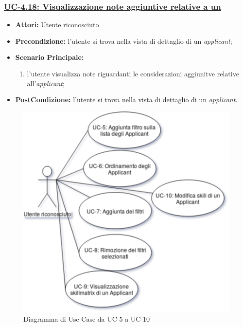 \subsubsection{\underline{UC-4.18: Visualizzazione note aggiuntive relative a un \applicant}}
\begin{itemize}
	\item \textbf{Attori:} Utente riconosciuto
	\item \textbf{Precondizione:} l'utente si trova nella vista di dettaglio di un \textit{applicant};
	\item \textbf{Scenario Principale:}
	\begin{enumerate} 
		\item l'utente visualizza note riguardanti le considerazioni aggiunitve relative all'\textit{applicant};
	\end{enumerate}
	\item \textbf{PostCondizione:} l'utente si trova nella vista di dettaglio di un \textit{applicant}.
\end{itemize}

\vspace{0.5em}
\begin{figure}[!h]
	\centering 
	\includegraphics[width=0.7\columnwidth]{immagini/usecase/UC6} 
	\caption{Diagramma di Use Case da UC-5 a UC-10}
	\label{figura:uc-6}
\end{figure}

